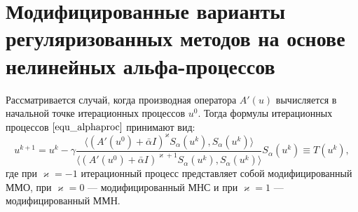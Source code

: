 \section{Модифицированные варианты регуляризованных методов на основе нелинейных альфа-процессов}
Рассматривается случай, когда производная оператора $A'(u)$ вычисляется в начальной точке итерационных процессов $u^0$. Тогда формулы итерационных процессов $\eqref{equ_alphaproc}$ принимают вид:
\begin{equation}\label{modalphaproc}
u^{k+1}=u^k-\gamma\frac{\langle (A'(u^0)+\bar\alpha I)^{\varkappa}S_\alpha(u^k), S_\alpha(u^k)\rangle}{\langle (A'(u^0)+\bar\alpha I)^{\varkappa+1}S_\alpha(u^k), S_\alpha(u^k)\rangle}S_\alpha(u^k)\equiv T(u^k),
\end{equation}
где при $\varkappa=-1$ итерационный процесс представляет собой модифицированный ММО, при $\varkappa=0$ --- модифицированный МНС и при $\varkappa=1$ --- модифицированный ММН.

